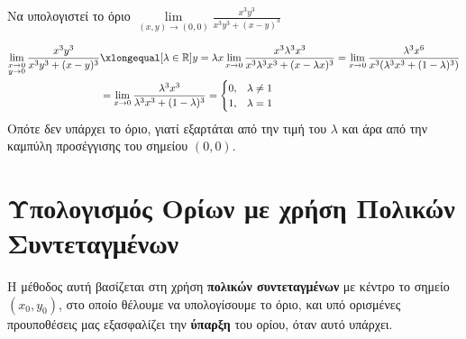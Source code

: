 \documentclass[a4paper,11pt]{report}
\begin{document}
  \begin{example}
    Να υπολογιστεί το όριο 
    $ \lim\limits_{(x,y)\to (0, 0)} \frac{x^{3}y^{3}}{x^{3}y^{3}+ (x-y)^{3}} $ 
    \begin{solution}
    \item {}
      \begin{align*}
        \lim\limits_{\substack{x \to 0\\ y \to 0}} \frac{x^{3}y^{3}}{x^{3}y^{3} + 
        (x-y)^{3}} 
    &\xlongequal[\lambda \in \mathbb{R}]{y = \lambda x} \lim_{x \to 0} \frac{x^{3} 
    \lambda ^{3} x^{3}}{x^{3} \lambda ^{3} x^{3} + (x - \lambda x)^{3}} 
    = \lim_{x \to 0} \frac{\lambda ^{3}x^{6}}{x^{3} 
    (\lambda ^{3} x^{3} + (1- \lambda)^{3})} \\
    &= \lim_{x \to 0} \frac{\lambda ^{3} x^{3}}{\lambda ^{3}x^{3} + (1- \lambda)^{3}} 
    = 
    \begin{cases} 
      0, & \lambda \neq 1 \\ 
      1, & \lambda = 1 
    \end{cases} 
      \end{align*} 
      Οπότε δεν υπάρχει το όριο, γιατί εξαρτάται από την τιμή του 
      $ \lambda $ και άρα από την καμπύλη προσέγγισης του σημείου 
      $ (0,0) $.
    \end{solution}
  \end{example}


  \section{Υπολογισμός Ορίων με χρήση Πολικών Συντεταγμένων}

  Η μέθοδος αυτή βασίζεται στη χρήση \textbf{πολικών συντεταγμένων} με κέντρο το σημείο 
  $ (x_{0}, y_{0}) $, στο οποίο θέλουμε να υπολογίσουμε το όριο, και υπό ορισμένες
  προυποθέσεις μας εξασφαλίζει 
  την \textbf{ύπαρξη} του ορίου, όταν αυτό υπάρχει.
\end{document}
